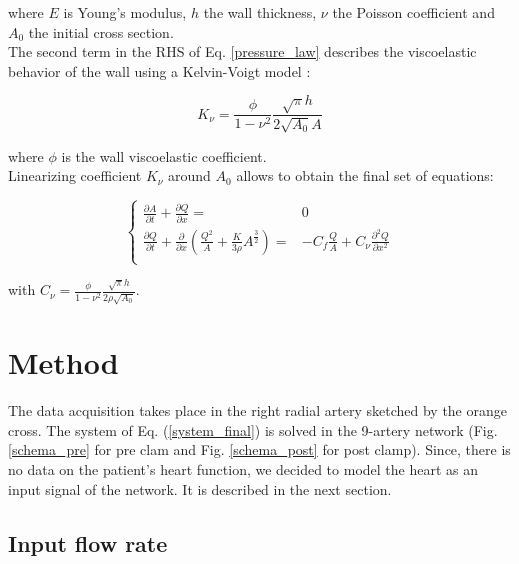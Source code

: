 \documentclass{config}
\begin{document}
where $E$ is Young's modulus, $h$ the wall thickness, $\nu$ the Poisson coefficient and $A_0$ the initial cross section.  \\ 

The second term in the RHS of Eq. \ref{pressure_law} describes the viscoelastic behavior of the wall using a Kelvin-Voigt model \cite{viscoelastic}: 

\begin{equation}\label{viscoelastic_part}
K_{\nu} = \frac{\phi}{1 - \nu^2}\frac{\sqrt{\pi} h}{2 \sqrt{A_0} A }
\end{equation}

where $\phi$ is the wall viscoelastic coefficient. \\

Linearizing coefficient $K_{\nu}$ around $A_0$ allows to obtain the final set of equations:

\begin{equation}\label{system_final}
\left\{\begin{array}{rl}
\displaystyle \frac{\partial A}{ \partial t } + \frac{\partial Q}{\partial x} = & 0 \\ 
\displaystyle \frac{\partial Q}{\partial t} + \frac{\partial }{\partial x} \left( \frac{Q^2}{A}+ \frac{K}{3 \rho} A^{\frac{3}{2}}\right) =&  \displaystyle - C_f \frac{Q}{A} + C_{\nu} \frac{\partial ^2 Q}{\partial x^2}  \\
\end{array} \right.
\end{equation}

with $C_{\nu} =\displaystyle \frac{\phi}{1 - \nu^2}\frac{\sqrt{\pi} h}{2 \rho \sqrt{A_0} }$.

\section{Method}

The data acquisition takes place in the right radial artery sketched by the orange cross. The system of Eq. (\ref{system_final}) is solved in the 9-artery network (Fig. \ref{schema_pre} for pre clam and Fig. \ref{schema_post} for post clamp). Since, there is no data on the patient's heart function, we decided to model the heart as an input signal of the network. It is described in the next section.

\subsection{Input flow rate}
\end{document}
